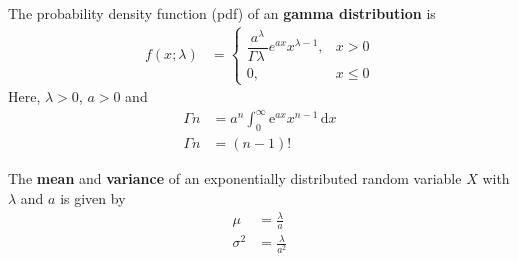 \documentclass[twocolumn]{article}
\providecommand{\brak}[1]{\ensuremath{\left(#1\right)}}
\begin{document}
\begin{definition}
The probability density function (pdf) of an \textbf{ gamma distribution} is
\begin{align}
f\brak{x;\lambda} &=
    \begin{cases}
    \dfrac{a^{\lambda}}{\Gamma{\lambda}\ } e^{ax}x^{\lambda-1} , & x > 0 \\
     0, &  x \leq 0
    \end{cases}
        \end{align}
Here, $\lambda > 0 $, $a>0$ and
\begin{align}
    \Gamma{n} &= a^{n} \int_{0}^{\infty} \mathrm{e}^{ax} x^{n -1} \, \mathrm{d}x \label{Gamma} \\
 \Gamma{n} &= \brak{n-1}! \label{GammaFac}   \end{align} 
\end{definition}
\begin{lemma}
The \textbf{mean} and \textbf{variance} of an exponentially distributed random variable $X$ with $\lambda$ and $a$ is given by
\begin{align}
    \mu &= \frac{\lambda}{a} \\
    \sigma^2 &= \frac{\lambda}{a^2}
\end{align}
\end{lemma}
\end{document}
